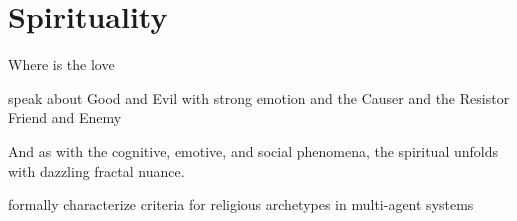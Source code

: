 \chapter{Spirituality}


Where is the love



speak about Good and Evil with strong emotion
and the Causer and the Resistor
Friend and Enemy

And as with the cognitive, emotive, and social phenomena, the spiritual unfolds with dazzling fractal nuance. 




formally characterize criteria for religious archetypes in multi-agent systems





